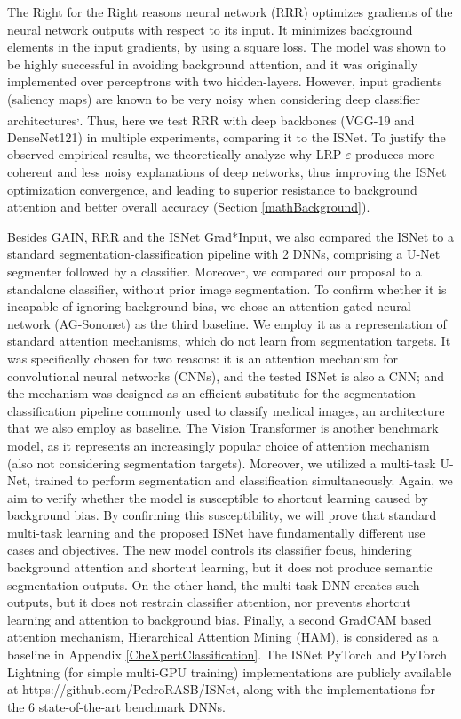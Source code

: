 \documentclass[fleqn,10pt]{wlscirep}
\begin{document}
The Right for the Right reasons neural network (RRR)\cite{RRR} optimizes gradients of the neural network outputs with respect to its input. It minimizes background elements in the input gradients, by using a square loss. The model was shown to be highly successful in avoiding background attention, and it was originally implemented over perceptrons with two hidden-layers\cite{RRR}. However, input gradients (saliency maps) are known to be very noisy when considering deep classifier architectures\cite{LRPvsGrad}\textsuperscript{,}\cite{LRP}. Thus, here we test RRR with deep backbones (VGG-19 and DenseNet121) in multiple experiments, comparing it to the ISNet. To justify the observed empirical results, we theoretically analyze why LRP-$\varepsilon$ produces more coherent and less noisy explanations of deep networks, thus improving the ISNet optimization convergence, and leading to superior resistance to background attention and better overall accuracy (Section \ref{mathBackground}).

Besides GAIN, RRR and the ISNet Grad*Input, we also compared the ISNet to a standard segmentation-classification pipeline with 2 DNNs, comprising a U-Net\cite{unet} segmenter followed by a classifier. Moreover, we compared our proposal to a standalone classifier, without prior image segmentation. To confirm whether it is incapable of ignoring background bias, we chose an attention gated neural network (AG-Sononet\cite{AGNet}) as the third baseline. We employ it as a representation of standard attention mechanisms, which do not learn from segmentation targets. It was specifically chosen for two reasons: it is an attention mechanism for convolutional neural networks (CNNs), and the tested ISNet is also a CNN; and the mechanism was designed as an efficient substitute for the segmentation-classification pipeline commonly used to classify medical images, an architecture that we also employ as baseline. The Vision Transformer\cite{VisionTransformer} is another benchmark model, as it represents an increasingly popular choice of attention mechanism (also not considering segmentation targets). Moreover, we utilized a multi-task U-Net, trained to perform segmentation and classification simultaneously. Again, we aim to verify whether the model is susceptible to shortcut learning caused by background bias. By confirming this susceptibility, we will prove that standard multi-task learning and the proposed ISNet have fundamentally different use cases and objectives. The new model controls its classifier focus, hindering background attention and shortcut learning, but it does not produce semantic segmentation outputs. On the other hand, the multi-task DNN creates such outputs, but it does not restrain classifier attention, nor prevents shortcut learning and attention to background bias. Finally, a second GradCAM based attention mechanism, Hierarchical Attention Mining (HAM)\cite{HAM}, is considered as a baseline in Appendix \ref{CheXpertClassification}. The ISNet PyTorch and PyTorch Lightning (for simple multi-GPU training) implementations are publicly available at https://github.com/PedroRASB/ISNet, along with the implementations for the 6 state-of-the-art benchmark DNNs.
\end{document}
